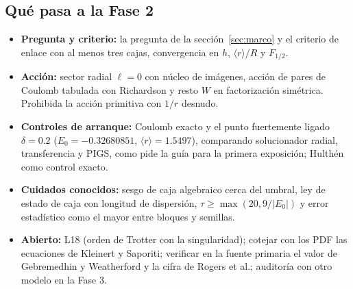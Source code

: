 \documentclass[11pt]{article}
\begin{document}
\subsection{Qué pasa a la Fase 2}

\begin{itemize}
\item \textbf{Pregunta y criterio:} la pregunta de la sección~\ref{sec:marco} y el criterio de enlace con al menos tres cajas, convergencia en $h$, $\langle r\rangle/R$ y $F_{1/2}$.
\item \textbf{Acción:} sector radial $\ell=0$ con núcleo de imágenes, acción de pares de Coulomb tabulada con Richardson y resto $W$ en factorización simétrica. Prohibida la acción primitiva con $1/r$ desnudo.
\item \textbf{Controles de arranque:} Coulomb exacto y el punto fuertemente ligado $\delta=0.2$ ($E_0=-0.32680851$, $\langle r\rangle=1.5497$), comparando solucionador radial, transferencia y PIGS, como pide la guía para la primera exposición; Hulthén como control exacto.
\item \textbf{Cuidados conocidos:} sesgo de caja algebraico cerca del umbral, ley de estado de caja con longitud de dispersión, $\tau\ge\max(20,9/|E_0|)$ y error estadístico como el mayor entre bloques y semillas.
\item \textbf{Abierto:} L18 (orden de Trotter con la singularidad); cotejar con los PDF las ecuaciones de Kleinert y Saporiti; verificar en la fuente primaria el valor de Gebremedhin y Weatherford y la cifra de Rogers et al.; auditoría con otro modelo en la Fase 3.
\end{itemize}
\end{document}
